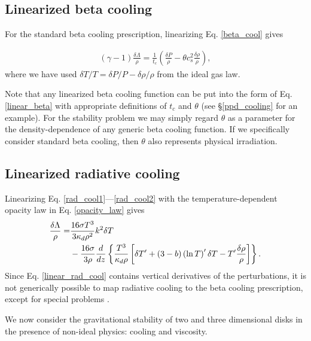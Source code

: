 \subsection{Linearized beta cooling}\label{linear_bcool}
For the standard beta cooling prescription, linearizing
Eq. \ref{beta_cool} gives

\begin{align}
  (\gamma-1)\frac{\delta \Lambda}{\rho} = \frac{1}{t_c}\left(\frac{\delta P}{\rho} -
  \theta c_s^2 \frac{\delta\rho}{\rho}\right), \label{linear_beta}
\end{align}
where we have used $\delta T/T  = \delta P/P - \delta\rho/\rho$ from
the ideal gas law. 

Note that any linearized beta cooling function can be put into the
form of Eq. \ref{linear_beta} with appropriate definitions of $t_c$
and $\theta$ (see \S\ref{ppd_cooling} for an example).    
For the stability problem we may simply regard $\theta$ as a parameter 
for the density-dependence of any generic beta cooling function. If 
we specifically consider standard beta cooling, then $\theta$ also
represents physical irradiation.     

\subsection{Linearized radiative cooling}
Linearizing Eq. \ref{rad_cool1}---\ref{rad_cool2} with the
temperature-dependent opacity law in Eq. \ref{opacity_law} gives
\begin{align}
  \frac{\delta \Lambda}{\rho} 
  =& \frac{16\sigma T^3}{3\kappa_d\rho^2} k^2 \delta T \notag\\
  & - \frac{16\sigma }{3\rho}\frac{d}{dz}\left\{
  \frac{T^3}{\kappa_d\rho}\left[\delta T^\prime +
    (3-b)\left(\ln{T}\right)^\prime \delta T - T^\prime \frac{\delta\rho}{\rho}\right]
  \right\}.\label{linear_rad_cool}
\end{align}
Since Eq. \ref{linear_rad_cool} contains vertical derivatives of the
perturbations, it is not generically possible to map radiative cooling 
to the beta cooling prescription, except for special problems
\citep[e.g.][]{lin15}. 

We now consider the gravitational stability of two and three 
dimensional disks in the presence of non-ideal
physics: cooling and viscosity.  
